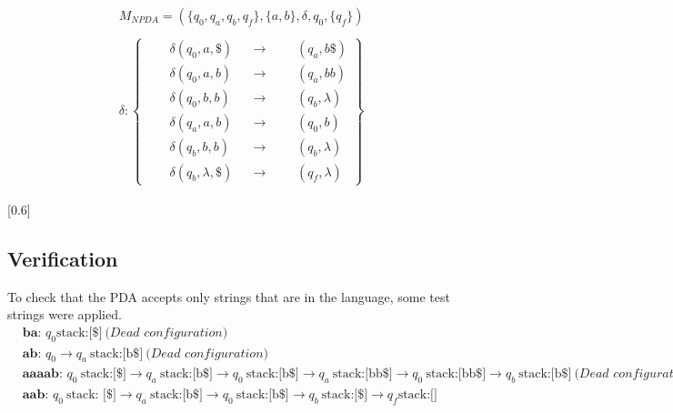 \documentclass{assignment-x}
\begin{document}
\begin{align*}
    &M_{NPDA} = (\{q_0,q_a,q_b, q_f\},\{a,b\},\delta,q_0,\{q_f\}) \\ \\
    &\delta:
    \left\{
    \begin{aligned}
        &\quad \delta(q_0,a,\$) &&\rightarrow &&&(q_a, b\$) \\
        &\quad \delta(q_0,a,b) &&\rightarrow &&&(q_a, bb) \\
        &\quad \delta(q_0,b,b) &&\rightarrow &&&(q_b, \lambda) \\
        &\quad \delta(q_a,a,b) &&\rightarrow &&&(q_0, b) \\
        &\quad \delta(q_b,b,b) &&\rightarrow &&&(q_b, \lambda) \\
        &\quad \delta(q_b,\lambda,\$) &&\rightarrow &&&(q_f, \lambda)
    \end{aligned}
    \right\}
\end{align*}

[0.6\linewidth]

\subsection{Verification}
To check that the PDA accepts only strings that are in the language, some test strings were applied.
\begin{align*}
    &\textbf{ba: } q_0 \text{stack:[\$]}\ \textit{(Dead configuration)}\\
    &\textbf{ab: } q_0 \rightarrow q_a\ \text{stack:[b\$]}\ \textit{(Dead configuration)}\\
    &\textbf{aaaab: } q_0\ \text{stack:[\$]} \rightarrow q_a\ \text{stack:[b\$]} \rightarrow q_0\ \text{stack:[b\$]}\rightarrow q_a\ \text{stack:[bb\$]}\rightarrow q_0\ \text{stack:[bb\$]}\rightarrow q_b\ \text{stack:[b\$]}\ \textit{(Dead configuration)}\\
    &\textbf{aab: } q_0\ \text{stack: [\$]} \rightarrow q_a\ \text{stack:[b\$]}  \rightarrow q_0\ \text{stack:[b\$]} \rightarrow q_b\ \text{stack:[\$]}  \rightarrow q_f \text{stack:[]}
\end{align*}
\end{document}
